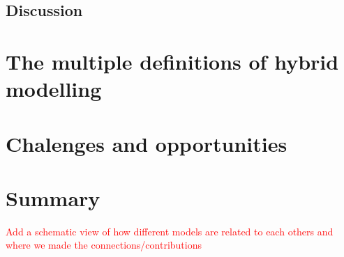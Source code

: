 \subsection{Discussion}

\section{The multiple definitions of hybrid modelling}

\section{Chalenges and opportunities}

\section{Summary}

\textcolor{red}{Add a schematic view of how different models are related to each others and where we made the connections/contributions}
